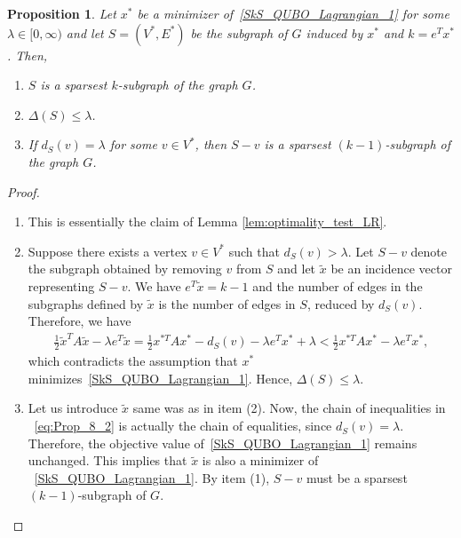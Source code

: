 \documentclass{article}
\newtheorem{prop}[thm]{Proposition}
\begin{document}
\begin{prop}\label{roman:obs}
Let $x^*$ be a minimizer of~\eqref{SkS_QUBO_Lagrangian_1} for some $\lambda\in [0,\infty)$ and let $S = (V^*, E^*)$ be the subgraph of $G$ induced by $x^*$ and $k = e^T x^*$. Then,
\begin{enumerate}
\item[(1)]\label{one} $S$ is a sparsest $k$-subgraph of the graph $G$.
\item[(2)]\label{two} $\Delta(S)\leq\lambda$.
\item[(3)]\label{three} If $d_S(v) = \lambda$ for some $v\in V^*$, then $S-v$ is a sparsest $(k-1)$-subgraph of the graph $G$.
\end{enumerate}
\end{prop}

\begin{proof}

~
\begin{enumerate}
\item[(1)] This is essentially the claim of Lemma \ref{lem:optimality_test_LR}.

    \item[(2)] Suppose there exists a vertex $v \in V^*$ such that $d_S(v) > \lambda$. Let  $S - v$ denote the subgraph obtained by removing $v$ from $S$ and let $\tilde x$ be an incidence vector representing   $S-v$. We have $e^T\tilde x=k-1$ and the number of edges in the subgraphs defined by $\tilde x$ is the number of edges in $S$, reduced by  $d_S(v)$. Therefore, we have   
    \begin{align}\label{eq:Prop_8_2}
    \frac{1}{2}\tilde x^TA\tilde x-\lambda e^T\tilde x = 
    \frac{1}{2} x^{*T}A x^*-d_S(v) - \lambda e^T x^*+\lambda  < 
    \frac{1}{2} x^{*T}A x^* - \lambda e^T x^*,    
    \end{align}
      which  contradicts the assumption that $x^*$ minimizes~\eqref{SkS_QUBO_Lagrangian_1}. Hence, $\Delta(S) \leq \lambda$.
    
    \item[(3)] Let us introduce $\tilde x$ same was as in item (2).
    Now, the chain of inequalities in ~\eqref{eq:Prop_8_2} is actually the chain of equalities, since $d_S(v) = \lambda$. Therefore, the objective value of~\eqref{SkS_QUBO_Lagrangian_1} remains unchanged. This implies that $\tilde x$ is also a minimizer of ~\eqref{SkS_QUBO_Lagrangian_1}. By item (1), $S - v$ must be a sparsest $(k-1)$-subgraph of $G$.
\end{enumerate}
\end{proof}
\end{document}
